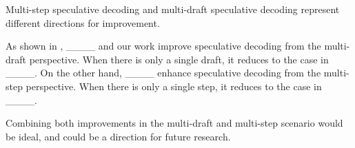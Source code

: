 Multi-step speculative decoding and multi-draft speculative decoding represent different directions for improvement.

As shown in , ____ and our work improve speculative decoding from the multi-draft perspective. When there is only a single draft, it reduces to the case in ____. On the other hand, ____ enhance speculative decoding from the multi-step perspective. When there is only a single step, it reduces to the case in ____.

Combining both improvements in the multi-draft and multi-step scenario would be ideal, and could be a direction for future research.
